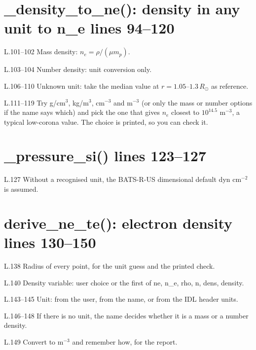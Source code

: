 \section*{\normalsize \_density\_to\_ne(): density in any unit to n\_e \hfill{\small\mdseries\color{gray}lines 94--120}}

\begin{lines}
\item[L.101–102] Mass density: $n_e=\rho/(\mu m_p)$.
\item[L.103–104] Number density: unit conversion only.
\item[L.106–110] Unknown unit: take the median value at $r=1.05$--$1.3\,R_\odot$ as reference.
\item[L.111–119] Try g/cm$^3$, kg/m$^3$, cm$^{-3}$ and m$^{-3}$ (or only the mass or number options if the name says which) and pick the one that gives $n_e$ closest to $10^{14.5}$ m$^{-3}$, a typical low-corona value. The choice is printed, so you can check it.
\end{lines}
\section*{\normalsize \_pressure\_si() \hfill{\small\mdseries\color{gray}lines 123--127}}

\begin{lines}
\item[L.127] Without a recognised unit, the BATS-R-US dimensional default dyn cm$^{-2}$ is assumed.
\end{lines}
\section*{\normalsize derive\_ne\_te(): electron density \hfill{\small\mdseries\color{gray}lines 130--150}}

\begin{lines}
\item[L.138] Radius of every point, for the unit guess and the printed check.
\item[L.140] Density variable: user choice or the first of ne, n\_e, rho, n, dens, density.
\item[L.143–145] Unit: from the user, from the name, or from the IDL header units.
\item[L.146–148] If there is no unit, the name decides whether it is a mass or a number density.
\item[L.149] Convert to m$^{-3}$ and remember how, for the report.
\end{lines}

